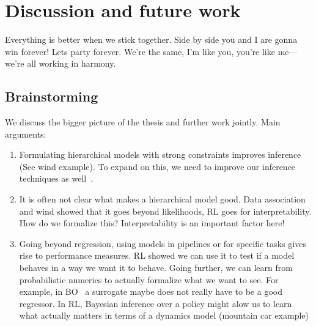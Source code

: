 \chapter{Discussion and future work}
\label{toc:discussion}
Everything is better when we stick together.
Side by side you and I are gonna win forever!
Lets party forever.
We're the same, I'm like you, you're like me---we're all working in harmony.

\section{Brainstorming}
We discuss the bigger picture of the thesis and further work jointly.
Main arguments:
\begin{enumerate}
    \item Formulating hierarchical models with strong constraints improves inference (See wind example). To expand on this, we need to improve our inference techniques as well~\parencite{ustyuzhaninov_compositional_2020}.
    \item It is often not clear what makes a hierarchical model good. Data association and wind showed that it goes beyond likelihoods, RL goes for interpretability. How do we formalize this? Interpretability is an important factor here!
    \item Going beyond regression, using models in pipelines or for specific tasks gives rise to performance measures. RL showed we can use it to test if a model behaves in a way we want it to behave. Going further, we can learn from probabilistic numerics to actually formalize what we want to see. For example, in BO~\parencite{bodin_modulating_2020} a surrogate maybe does not really have to be a good regressor. In RL, Bayesian inference over a policy might alow us to learn what actually matters in terms of a dynamics model (mountain car example)
\end{enumerate}

